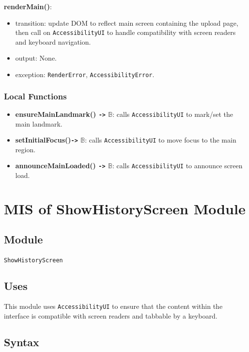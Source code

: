 \documentclass[12pt, titlepage]{article}
\newcommand{\Bool}{\ensuremath{\mathbb{B}}}
\begin{document}
\noindent \textbf{renderMain()}:
\begin{itemize}
  \item transition: update DOM to reflect main screen containing the
    upload page, then call on \texttt{AccessibilityUI} to
    handle compatibility with screen readers and keyboard navigation.
  \item output: None.
  \item exception: \texttt{RenderError}, \texttt{AccessibilityError}.
\end{itemize}

\subsubsection{Local Functions}

\begin{itemize}
  \item \textbf{ensureMainLandmark()  \texttt{->} \Bool}: calls
    \texttt{AccessibilityUI}
    to mark/set the main landmark.
  \item \textbf{setInitialFocus()\texttt{->} \Bool}: calls
    \texttt{AccessibilityUI}
    to move focus to the main region.
  \item \textbf{announceMainLoaded() \texttt{->} \Bool}: calls
    \texttt{AccessibilityUI}
    to announce screen load.

\end{itemize}

\section{MIS of ShowHistoryScreen Module}\label{showHistory}

\subsection{Module}

\texttt{ShowHistoryScreen}

\subsection{Uses}

This module uses \texttt{AccessibilityUI} to ensure that the content
within the interface is
compatible with screen readers and tabbable by a keyboard.

\subsection{Syntax}
\end{document}
